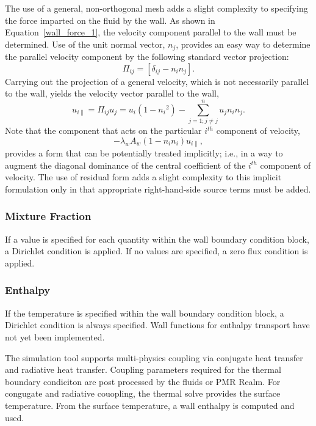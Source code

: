 The use of a general, non-orthogonal mesh adds a slight complexity to 
specifying the force imparted on the fluid by the wall.
As shown in Equation~\ref{wall_force_1}, the velocity component parallel to 
the wall must be determined. Use of the unit normal vector, $n_j$, 
provides an easy way to determine the parallel velocity component by the 
following standard vector projection:
%
\begin{equation}
        \Pi_{ij} = \left [ \delta_{ij} - n_i n_j \right].
\label{proj_oper}
\end{equation}
%
Carrying out the projection of a general velocity,
which is not necessarily parallel to the wall, yields the velocity vector 
parallel to the wall,
%
\begin{equation}
        u_{i\|} = \Pi_{ij} {u}_j = u_i\left(1-{n_i}^2\right)
        -\sum_{j=1;j\neq j}^{n} u_j n_i n_j.
\label{proj_operU}
\end{equation}
%
Note that the component that acts on the particular $i^{th}$ component of 
velocity,
%
\begin{equation}
        -\lambda_w A_w \left(1-n_i n_i\right) u_{i\|} ,
\label{implicit_shear}
\end{equation}
%
provides a form that can be potentially treated implicitly; i.e., in a way to 
augment the diagonal dominance of the central coefficient of the $i^{th}$ 
component of velocity. The use of residual form adds a slight complexity to
this implicit formulation only in that appropriate right-hand-side source terms
must be added.

\subsubsection{Mixture Fraction}
If a value is specified for each quantity within the wall boundary condition block, a Dirichlet condition
is applied. If no values are specified, a zero flux condition is applied.

\subsubsection{Enthalpy}
If the temperature is specified within the wall boundary condition block, a Dirichlet condition
is always specified. Wall functions for enthalpy transport have not yet been implemented. 

The simulation tool supports multi-physics coupling via conjugate heat transfer and radiative heat transfer.
Coupling parameters required for the thermal boundary condiciton are post processed by the fluids or PMR Realm.
For congugate and radiative couopling, the thermal solve provides the surface temperature. From the surface temperature, 
a wall enthalpy is computed and used.

